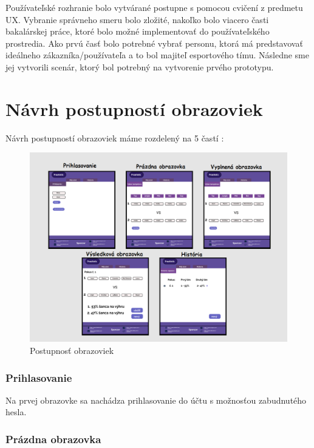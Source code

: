 Používateľské rozhranie bolo vytvárané postupne s pomocou cvičení z predmetu UX. Vybranie správneho smeru bolo zložité, nakoľko bolo viacero časti bakalárskej práce, ktoré bolo možné implementovať do používateľského prostredia. Ako prvú časť bolo potrebné vybrať personu, ktorá má predstavovať ideálneho zákazníka/používateľa a to bol majiteľ esportového tímu. Následne sme jej vytvorili scenár, ktorý bol potrebný na vytvorenie prvého prototypu. 



\section*{Návrh postupností obrazoviek}

Návrh postupností obrazoviek máme rozdelený na 5 častí :



\begin{figure}[h!]
	
	\includegraphics[width=.9\textwidth]{figures/postupnost}
	
	\centering
	
	\caption{ Postupnosť obrazoviek \label{jednanula}}
	
\end{figure}



\subsubsection{Prihlasovanie}

Na prvej obrazovke sa nachádza prihlasovanie do účtu s možnosťou zabudnutého hesla.

\subsubsection{Prázdna obrazovka}

